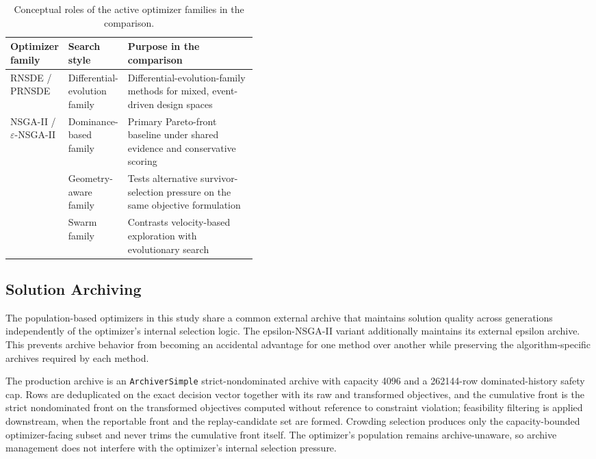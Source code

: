         \begin{table}[htb]
            \centering
            \caption[Active optimizer roles]{Conceptual roles of the active optimizer families in the comparison.}
            \label{tab:optimizer_roles}
            \begin{tabularx}{0.94\linewidth}{@{}L{0.22\linewidth}L{0.20\linewidth}Y@{}}
                \toprule
                Optimizer family & Search style & Purpose in the comparison \\
                \midrule
                RNSDE / PRNSDE & Differential-evolution family & Differential-evolution-family methods for mixed, event-driven design spaces \\
                NSGA-II / \(\varepsilon\)-NSGA-II & Dominance-based  family & Primary Pareto-front baseline under shared evidence and conservative scoring \\
                 & Geometry-aware  family & Tests alternative survivor-selection pressure on the same objective formulation \\
                 & Swarm family & Contrasts velocity-based exploration with evolutionary search \\
                \bottomrule
            \end{tabularx}
        \end{table}

        \subsection{Solution Archiving} \label{ss:tam}
        The population-based optimizers in this study share a common external archive that maintains solution quality across generations independently of the optimizer's internal selection logic. The epsilon-NSGA-II variant additionally maintains its external epsilon archive. This prevents archive behavior from becoming an accidental advantage for one method over another while preserving the algorithm-specific archives required by each method.

        The production archive is an \texttt{ArchiverSimple} strict-nondominated archive with capacity \num{4096} and a \num{262144}-row dominated-history safety cap. Rows are deduplicated on the exact decision vector together with its raw and transformed objectives, and the cumulative front is the strict nondominated front on the transformed objectives computed without reference to constraint violation; feasibility filtering is applied downstream, when the reportable front and the replay-candidate set are formed. Crowding selection produces only the capacity-bounded optimizer-facing subset and never trims the cumulative front itself. The optimizer's population remains archive-unaware, so archive management does not interfere with the optimizer's internal selection pressure.


